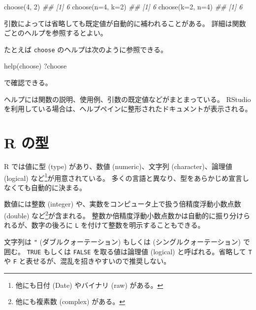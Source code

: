 \documentclass[
  letterpaper,
  xelatex,
  ja=standard, xelatex]{bxjsbook}
\newenvironment{Shaded}{\begin{snugshade}}{\end{snugshade}}
\newcommand{\AttributeTok}[1]{\textcolor[rgb]{0.40,0.45,0.13}{#1}}
\newcommand{\DecValTok}[1]{\textcolor[rgb]{0.68,0.00,0.00}{#1}}
\newcommand{\DocumentationTok}[1]{\textcolor[rgb]{0.37,0.37,0.37}{\textit{#1}}}
\newcommand{\FunctionTok}[1]{\textcolor[rgb]{0.28,0.35,0.67}{#1}}
\newcommand{\NormalTok}[1]{\textcolor[rgb]{0.00,0.23,0.31}{#1}}
\begin{document}
\begin{Shaded}
\begin{Highlighting}[]
\FunctionTok{choose}\NormalTok{(}\DecValTok{4}\NormalTok{, }\DecValTok{2}\NormalTok{)}
\DocumentationTok{\#\# [1] 6}
\FunctionTok{choose}\NormalTok{(}\AttributeTok{n=}\DecValTok{4}\NormalTok{, }\AttributeTok{k=}\DecValTok{2}\NormalTok{)}
\DocumentationTok{\#\# [1] 6}
\FunctionTok{choose}\NormalTok{(}\AttributeTok{k=}\DecValTok{2}\NormalTok{, }\AttributeTok{n=}\DecValTok{4}\NormalTok{)}
\DocumentationTok{\#\# [1] 6}
\end{Highlighting}
\end{Shaded}

引数によっては省略しても既定値が自動的に補われることがある。
詳細は関数ごとのヘルプを参照するとよい。

たとえば \texttt{choose} のヘルプは次のように参照できる。

\begin{Shaded}
\begin{Highlighting}[]
\FunctionTok{help}\NormalTok{(choose)}
\NormalTok{?choose}
\end{Highlighting}
\end{Shaded}

で確認できる。

ヘルプには関数の説明、使用例、引数の既定値などがまとまっている。 RStudio
を利用している場合は、ヘルプペインに整形されたドキュメントが表示される。

\section{R の型}\label{r-ux306eux578b}

R では値に型 (type) があり、数値 (numeric)、文字列 (character)、論理値
(logical) など\footnote{他にも日付 (Date) やバイナリ (raw) がある。}が用意されている。
多くの言語と異なり、型をあらかじめ宣言しなくても自動的に決まる。

数値には整数 (integer) や、実数をコンピュータ上で扱う倍精度浮動小数点数
(double) など\footnote{他にも複素数 (complex) がある。}が含まれる。
整数か倍精度浮動小数点数かは自動的に振り分けられるが、数字の後ろに
\texttt{L} を付けて整数を明示することもできる。

文字列は \texttt{"} (ダブルクォーテーション) もしくは
\texttt{\textquotesingle{}} (シングルクォーテーション) で囲む。
\texttt{TRUE} もしくは \texttt{FALSE} を取る値は論理値 (logical)
と呼ばれる。省略して \texttt{T} や \texttt{F}
と表せるが、混乱を招きやすいので推奨しない。
\end{document}
